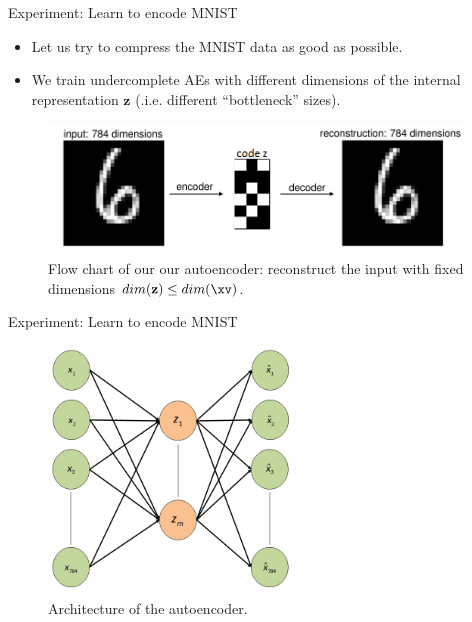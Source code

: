 \begin{frame}{Experiment: Learn to encode MNIST}
  \begin{itemize}
    \item Let us try to compress the MNIST data as good as possible.
    \item We train undercomplete AEs %
     with different dimensions of the internal representation $\mathbf{z}$ (.i.e. different \enquote{bottleneck} sizes).
  \end{itemize}
  \begin{figure}
    \centering
    \includegraphics[width=11cm]{plots/autoencoder_mnist_problem.png}
    \caption{Flow chart of our our autoencoder: reconstruct the input with fixed dimensions $dim(\mathbf{z}) \leq dim(\xv)$.}
  \end{figure}
\end{frame}
\begin{frame}{Experiment: Learn to encode MNIST}
  \begin{figure}
    \centering
    \includegraphics[width=6.5cm]{plots/autoencoder_mnist_example.png}
    \caption{Architecture of the autoencoder.}
  \end{figure}
\end{frame}

